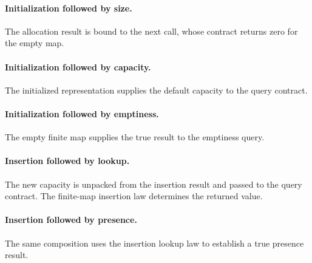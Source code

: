 \documentclass[11pt]{article}
\begin{document}


\paragraph{Initialization followed by size.} The allocation result is bound to the next call, whose contract returns zero for the empty map.



\paragraph{Initialization followed by capacity.} The initialized representation supplies the default capacity to the query contract.



\paragraph{Initialization followed by emptiness.} The empty finite map supplies the true result to the emptiness query.



\paragraph{Insertion followed by lookup.} The new capacity is unpacked from the insertion result and passed to the query contract. The finite-map insertion law determines the returned value.



\paragraph{Insertion followed by presence.} The same composition uses the insertion lookup law to establish a true presence result.




\end{document}
